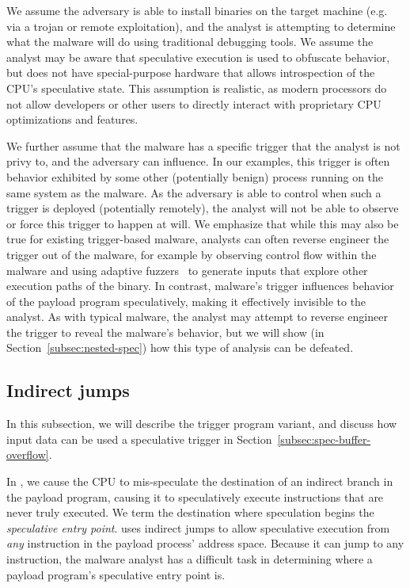 We assume the adversary is able to install binaries on the target machine (e.g.
via a trojan or remote exploitation), and the analyst is attempting to determine
what the malware will do using traditional debugging tools. We assume the
analyst may be aware that speculative execution is used to obfuscate behavior,
but does not have special-purpose hardware that allows introspection of the
CPU's speculative state. This assumption is realistic, as modern processors do
not allow developers or other users to directly interact with proprietary CPU
optimizations and features.

We further assume that the malware has a specific trigger that the analyst is
not privy to, and the adversary can influence. In our examples, this
trigger is often behavior exhibited by some other (potentially benign) process
running on the same system as the malware. As the adversary is able to control
when such a trigger is deployed (potentially remotely), the analyst will not be
able to observe or force this trigger to happen at will. We emphasize that while
this may also be true for existing trigger-based malware, analysts can often
reverse engineer the trigger out of the malware, for example by observing
control flow within the malware and using adaptive
fuzzers~\cite{afl,stephens2016driller} to generate inputs that explore other
execution paths of the binary. In contrast, \speculake malware's trigger
influences behavior of the payload program speculatively, making it effectively
invisible to the analyst. As with typical
malware, the analyst may attempt to reverse engineer the trigger to reveal the
malware's behavior, but we will show (in Section~\ref{subsec:nested-spec}) how
this type of analysis can be defeated.

\subsection{Indirect jumps}

In this subsection, we will describe the trigger program variant, and discuss how
input data can be used a speculative trigger in
Section~\ref{subsec:spec-buffer-overflow}.

In \speculake, we cause the CPU to mis-speculate the destination of an indirect
branch in the payload program, causing it to speculatively execute 
instructions that are never truly executed. We term the destination where speculation begins
the \emph{speculative entry point}. \speculake uses indirect jumps to allow
speculative execution from \emph{any} instruction in the payload process'
address space. Because it can jump to any instruction, the malware analyst has a
difficult task in determining where a payload program's speculative entry point
is.

